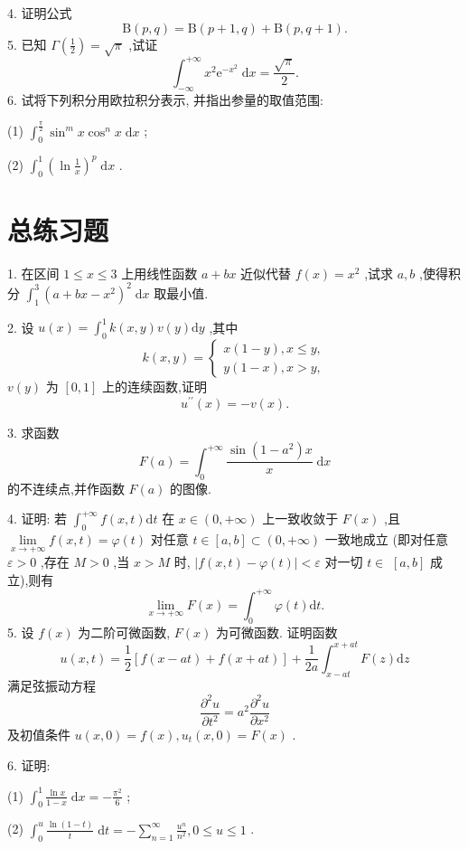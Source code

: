 4. 证明公式
\[
\mathrm{B}\left( {p,q}\right)  = \mathrm{B}\left( {p + 1,q}\right)  + \mathrm{B}\left( {p,q + 1}\right) .
\]
5. 已知 \(\Gamma \left( \frac{1}{2}\right)  = \sqrt{\pi }\) ,试证
\[
{\int }_{-\infty }^{+\infty }{x}^{2}{\mathrm{e}}^{-{x}^{2}}\mathrm{\;d}x = \frac{\sqrt{\pi }}{2}.
\]
6. 试将下列积分用欧拉积分表示, 并指出参量的取值范围:

(1) \({\int }_{0}^{\frac{\pi }{2}}{\sin }^{m}x{\cos }^{n}x\mathrm{\;d}x\) ;

(2) \({\int }_{0}^{1}{\left( \ln \frac{1}{x}\right) }^{p}\mathrm{\;d}x\) .

\section{总练习题}

1. 在区间 \(1 \leq  x \leq  3\) 上用线性函数 \(a + {bx}\) 近似代替 \(f\left( x\right)  = {x}^{2}\) ,试求 \(a,b\) ,使得积分 \({\int }_{1}^{3}{\left( a + bx - {x}^{2}\right) }^{2}\mathrm{\;d}x\) 取最小值.

2. 设 \(u\left( x\right)  = {\int }_{0}^{1}k\left( {x,y}\right) v\left( y\right) \mathrm{d}y\) ,其中
\[
k\left( {x,y}\right)  = \left\{  \begin{array}{l} x\left( {1 - y}\right) ,x \leq  y, \\  y\left( {1 - x}\right) ,x > y, \end{array}\right.
\]
\(v\left( y\right)\) 为 \(\left\lbrack  {0,1}\right\rbrack\) 上的连续函数,证明
\[
{u}^{\prime \prime }\left( x\right)  =  - v\left( x\right) .
\]


3. 求函数
\[
F\left( a\right)  = {\int }_{0}^{+\infty }\frac{\sin \left( {1 - {a}^{2}}\right) x}{x}\mathrm{\;d}x
\]
的不连续点,并作函数 \(F\left( a\right)\) 的图像.

4. 证明: 若 \({\int }_{0}^{+\infty }f\left( {x,t}\right) \mathrm{d}t\) 在 \(x \in  \left( {0, + \infty }\right)\) 上一致收敛于 \(F\left( x\right)\) ,且 \(\mathop{\lim }\limits_{{x \rightarrow   + \infty }}f\left( {x,t}\right)  = \varphi \left( t\right)\) 对任意 \(t \in  \left\lbrack  {a,b}\right\rbrack   \subset  \left( {0, + \infty }\right)\) 一致地成立 (即对任意 \(\varepsilon  > 0\) ,存在 \(M > 0\) ,当 \(x > M\) 时, \(\left| {f\left( {x,t}\right)  - \varphi \left( t\right) }\right|  < \varepsilon\) 对一切 \(t \in\)  \(\left\lbrack  {a,b}\right\rbrack\) 成立),则有
\[
\mathop{\lim }\limits_{{x \rightarrow   + \infty }}F\left( x\right)  = {\int }_{0}^{+\infty }\varphi \left( t\right) \mathrm{d}t.
\]
5. 设 \(f\left( x\right)\) 为二阶可微函数, \(F\left( x\right)\) 为可微函数. 证明函数
\[
u\left( {x,t}\right)  = \frac{1}{2}\left\lbrack  {f\left( {x - {at}}\right)  + f\left( {x + {at}}\right) }\right\rbrack   + \frac{1}{2a}{\int }_{x - {at}}^{x + {at}}F\left( z\right) \mathrm{d}z
\]
满足弦振动方程
\[
\frac{{\partial }^{2}u}{\partial {t}^{2}} = {a}^{2}\frac{{\partial }^{2}u}{\partial {x}^{2}}
\]
及初值条件 \(u\left( {x,0}\right)  = f\left( x\right) ,{u}_{t}\left( {x,0}\right)  = F\left( x\right)\) .

6. 证明:

(1) \({\int }_{0}^{1}\frac{\ln x}{1 - x}\mathrm{\;d}x =  - \frac{{\pi }^{2}}{6}\) ;

(2) \({\int }_{0}^{u}\frac{\ln \left( {1 - t}\right) }{t}\mathrm{\;d}t =  - \mathop{\sum }\limits_{{n = 1}}^{\infty }\frac{{u}^{n}}{{n}^{2}},0 \leq  u \leq  1\) .

